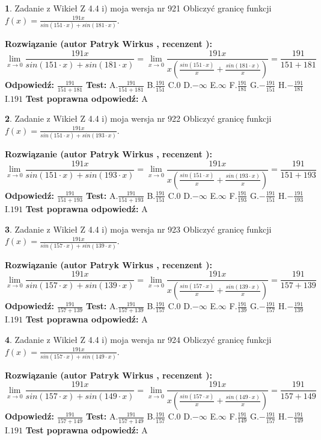 \documentclass[12pt, a4paper]{article}
\theoremstyle{definition} %
\newtheorem{zad}{}
\newcommand{\zadStart}[1]{\begin{zad}#1\newline}
\newcommand{\zadStop}{\end{zad}}
\newcommand{\rozwStart}[2]{\noindent \textbf{Rozwiązanie (autor #1 , recenzent #2): }\newline}
\newcommand{\rozwStop}{\newline}
\newcommand{\odpStart}{\noindent \textbf{Odpowiedź:}\newline}
\newcommand{\odpStop}{\newline}
\newcommand{\testStart}{\noindent \textbf{Test:}\newline}
\newcommand{\testStop}{\newline}
\newcommand{\kluczStart}{\noindent \textbf{Test poprawna odpowiedź:}\newline}
\newcommand{\kluczStop}{\newline}
\begin{document}
\zadStart{Zadanie z Wikieł Z 4.4 i) moja wersja nr 921}
Obliczyć granicę funkcji $f(x)=\frac{191x}{sin(151\cdot x) +sin(181\cdot x)}$.
\zadStop
\rozwStart{Patryk Wirkus}{}
$$\lim\limits_{x\to 0}\frac{191x}{sin(151\cdot x) +sin(181\cdot x)}=\lim\limits_{x\to 0}\frac{191x}{x(\frac{sin(151\cdot x)}{x}+\frac{sin(181\cdot x)}{x})}=\frac{191}{151+181}$$
\rozwStop
\odpStart
$\frac{191}{151+181}$
\odpStop
\testStart
A.$\frac{191}{151+181}$
B.$\frac{191}{151}$
C.$0$
D.$-\infty$
E.$\infty$
F.$\frac{191}{181}$
G.$-\frac{191}{151}$
H.$-\frac{191}{181}$
I.$191$
\testStop
\kluczStart
A
\kluczStop



\zadStart{Zadanie z Wikieł Z 4.4 i) moja wersja nr 922}
Obliczyć granicę funkcji $f(x)=\frac{191x}{sin(151\cdot x) +sin(193\cdot x)}$.
\zadStop
\rozwStart{Patryk Wirkus}{}
$$\lim\limits_{x\to 0}\frac{191x}{sin(151\cdot x) +sin(193\cdot x)}=\lim\limits_{x\to 0}\frac{191x}{x(\frac{sin(151\cdot x)}{x}+\frac{sin(193\cdot x)}{x})}=\frac{191}{151+193}$$
\rozwStop
\odpStart
$\frac{191}{151+193}$
\odpStop
\testStart
A.$\frac{191}{151+193}$
B.$\frac{191}{151}$
C.$0$
D.$-\infty$
E.$\infty$
F.$\frac{191}{193}$
G.$-\frac{191}{151}$
H.$-\frac{191}{193}$
I.$191$
\testStop
\kluczStart
A
\kluczStop



\zadStart{Zadanie z Wikieł Z 4.4 i) moja wersja nr 923}
Obliczyć granicę funkcji $f(x)=\frac{191x}{sin(157\cdot x) +sin(139\cdot x)}$.
\zadStop
\rozwStart{Patryk Wirkus}{}
$$\lim\limits_{x\to 0}\frac{191x}{sin(157\cdot x) +sin(139\cdot x)}=\lim\limits_{x\to 0}\frac{191x}{x(\frac{sin(157\cdot x)}{x}+\frac{sin(139\cdot x)}{x})}=\frac{191}{157+139}$$
\rozwStop
\odpStart
$\frac{191}{157+139}$
\odpStop
\testStart
A.$\frac{191}{157+139}$
B.$\frac{191}{157}$
C.$0$
D.$-\infty$
E.$\infty$
F.$\frac{191}{139}$
G.$-\frac{191}{157}$
H.$-\frac{191}{139}$
I.$191$
\testStop
\kluczStart
A
\kluczStop



\zadStart{Zadanie z Wikieł Z 4.4 i) moja wersja nr 924}
Obliczyć granicę funkcji $f(x)=\frac{191x}{sin(157\cdot x) +sin(149\cdot x)}$.
\zadStop
\rozwStart{Patryk Wirkus}{}
$$\lim\limits_{x\to 0}\frac{191x}{sin(157\cdot x) +sin(149\cdot x)}=\lim\limits_{x\to 0}\frac{191x}{x(\frac{sin(157\cdot x)}{x}+\frac{sin(149\cdot x)}{x})}=\frac{191}{157+149}$$
\rozwStop
\odpStart
$\frac{191}{157+149}$
\odpStop
\testStart
A.$\frac{191}{157+149}$
B.$\frac{191}{157}$
C.$0$
D.$-\infty$
E.$\infty$
F.$\frac{191}{149}$
G.$-\frac{191}{157}$
H.$-\frac{191}{149}$
I.$191$
\testStop
\kluczStart
A
\kluczStop
\end{document}
